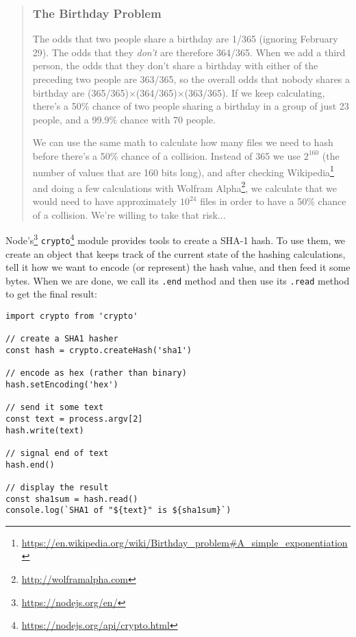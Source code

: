 \documentclass[krantzl]{krantz}
\newenvironment{callout}{\savenotes\begin{tBox}\begin{quotation}\toggletrue{inbox}\renewcommand{\thempfootnote}{\arabic{footnote}}}{\end{quotation}\vspace{\baselineskip}\end{tBox}\togglefalse{inbox}\spewnotes}
\newcommand{\hreffoot}[2]{{#1}\footnote{\href{#2}{#2}}}
\begin{document}
\begin{callout}


\subsubsection*{The Birthday Problem}


The odds that two people share a birthday are 1/365 (ignoring February 29).
The odds that they \emph{don't} are therefore 364/365.
When we add a third person,
the odds that they don't share a birthday with either of the preceding two people are 363/365,
so the overall odds that nobody shares a birthday are (365/365)×(364/365)×(363/365).
If we keep calculating, there's a 50\% chance of two people sharing a birthday in a group of just 23 people,
and a 99.9\% chance with 70 people.


We can use the same math to calculate how many files we need to hash before there's a 50\% chance of a collision.
Instead of 365 we use $2^{160}$ (the number of values that are 160 bits long),
and after checking \hreffoot{Wikipedia}{https://en.wikipedia.org/wiki/Birthday\_problem\#A\_simple\_exponentiation}
and doing a few calculations with \hreffoot{Wolfram Alpha}{http://wolframalpha.com},
we calculate that we would need to have approximately $10^{24}$ files
in order to have a 50\% chance of a collision.
We're willing to take that risk...

\end{callout}


\hreffoot{Node's}{https://nodejs.org/en/} \hreffoot{\texttt{crypto}}{https://nodejs.org/api/crypto.html} module provides tools to create a SHA-1 hash.
To use them,
we create an object that keeps track of the current state of the hashing calculations,
tell it how we want to encode (or represent) the hash value,
and then feed it some bytes.
When we are done,
we call its \texttt{.end} method
and then use its \texttt{.read} method to get the final result:


\begin{lstlisting}[frame=single,frameround=tttt]
import crypto from 'crypto'

// create a SHA1 hasher
const hash = crypto.createHash('sha1')

// encode as hex (rather than binary)
hash.setEncoding('hex')

// send it some text
const text = process.argv[2]
hash.write(text)

// signal end of text
hash.end()

// display the result
const sha1sum = hash.read()
console.log(`SHA1 of "${text}" is ${sha1sum}`)
\end{lstlisting}
\end{document}
